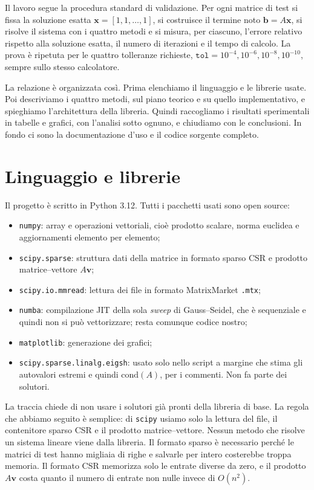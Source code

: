 \documentclass[11pt,a4paper]{article}
\begin{document}
Il lavoro segue la procedura standard di validazione. Per ogni matrice di test
si fissa la soluzione esatta $\mathbf{x}=[1,1,\dots,1]$, si costruisce il
termine noto $\mathbf{b}=A\mathbf{x}$, si risolve il sistema con i quattro metodi
e si misura, per ciascuno, l'errore relativo rispetto alla soluzione esatta, il
numero di iterazioni e il tempo di calcolo. La prova è ripetuta per le quattro
tolleranze richieste, $\texttt{tol}=10^{-4},10^{-6},10^{-8},10^{-10}$, sempre
sullo stesso calcolatore.

La relazione è organizzata così. Prima elenchiamo il linguaggio e le librerie
usate. Poi descriviamo i quattro metodi, sul piano teorico e su quello
implementativo, e spieghiamo l'architettura della libreria. Quindi raccogliamo i
risultati sperimentali in tabelle e grafici, con l'analisi sotto ognuno, e
chiudiamo con le conclusioni. In fondo ci sono la documentazione d'uso e il
codice sorgente completo.

\section{Linguaggio e librerie}\label{sec:python}
Il progetto è scritto in Python 3.12. Tutti i pacchetti usati sono
open source:
\begin{itemize}[leftmargin=1.6em]
  \item \texttt{numpy}: array e operazioni vettoriali, cioè prodotto scalare,
  norma euclidea e aggiornamenti elemento per elemento;
  \item \texttt{scipy.sparse}: struttura dati della matrice in formato sparso
  CSR e prodotto matrice--vettore $A\mathbf{v}$;
  \item \texttt{scipy.io.mmread}: lettura dei file in formato MatrixMarket
  \texttt{.mtx};
  \item \texttt{numba}: compilazione JIT della sola \emph{sweep} di
  Gauss--Seidel, che è sequenziale e quindi non si può vettorizzare; resta
  comunque codice nostro;
  \item \texttt{matplotlib}: generazione dei grafici;
  \item \texttt{scipy.sparse.linalg.eigsh}: usato solo nello script a margine
  che stima gli autovalori estremi e quindi $\mathrm{cond}(A)$, per i commenti.
  Non fa parte dei solutori.
\end{itemize}

La traccia chiede di non usare i solutori già pronti della libreria di base.
La regola che abbiamo seguito è semplice: di \texttt{scipy} usiamo solo la
lettura del file, il contenitore sparso CSR e il prodotto matrice--vettore.
Nessun metodo che risolve un sistema lineare viene dalla libreria. Il formato
sparso è necessario perché le matrici di test hanno migliaia di righe e salvarle
per intero costerebbe troppa memoria. Il formato CSR memorizza solo le
entrate diverse da zero, e il prodotto $A\mathbf{v}$ costa quanto il numero di
entrate non nulle invece di $O(n^2)$.
\end{document}

